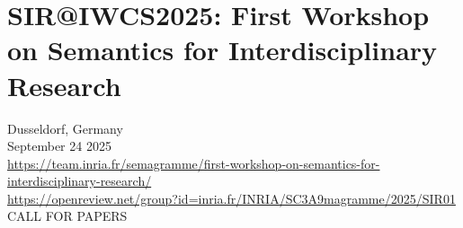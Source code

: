 \documentclass[prodmode,acmtecs]{acmsmall} %
\begin{document}
\section{SIR@IWCS2025: First Workshop on Semantics for Interdisciplinary Research}\label{SIRIWCS2025}  Dusseldorf, Germany\\ 
  September 24 2025\\ 
  \href{https://team.inria.fr/semagramme/first-workshop-on-semantics-for-interdisciplinary-research/}{https://team.inria.fr/semagramme/first-workshop-on-semantics-for-interdisciplinary-research/}\\ 
  \href{https://openreview.net/group?id=inria.fr/INRIA/SC3A9magramme/2025/SIR01}{https://openreview.net/group?id=inria.fr/INRIA/SC3A9magramme/2025/SIR01}\\ 
CALL FOR PAPERS 
\end{document}
